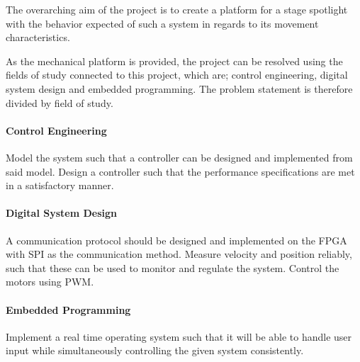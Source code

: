 \documentclass[../../main]{subfiles}
\begin{document}
The overarching aim of the project is to create a platform for a stage spotlight with the behavior expected of such a system in regards to its movement characteristics.

As the mechanical platform is provided, the project can be resolved using the fields of study connected to this project, which are; control engineering, digital system design and embedded programming.
The problem statement is therefore divided by field of study.




\paragraph{Control Engineering}%
\label{par:control_engineering}
Model the system such that a controller can be designed and implemented from said model.
Design a controller such that the performance specifications are met in a satisfactory manner.

\paragraph{Digital System Design}%
\label{par:digital_system_design}
A communication protocol should be designed and implemented on the FPGA with SPI as the communication method.
Measure velocity and position reliably, such that these can be used to monitor and regulate the
system.
Control the motors using PWM.

\paragraph{Embedded Programming}%
\label{par:emebedded_programming}
Implement a real time operating system such that it will be able to handle user input while simultaneously controlling the given system consistently.
\\
\end{document}
